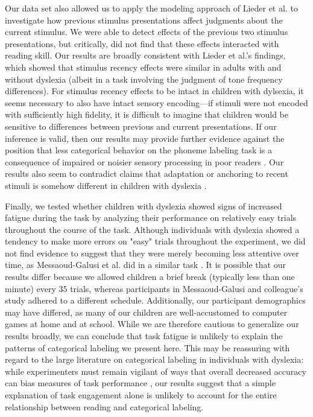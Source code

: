 \documentclass[../uwthesis.tex]{subfiles}
\begin{document}
Our data set also allowed us to apply the modeling approach of Lieder et al. \citep{Lieder2019PerceptualDyslexia} to investigate how previous stimulus presentations affect judgments about the current stimulus. We were able to detect effects of the previous two stimulus presentations, but critically, did not find that these effects interacted with reading skill. Our results are broadly consistent with Lieder et al.'s findings, which showed that stimulus recency effects were similar in adults with and without dyslexia (albeit in a task involving the judgment of tone frequency differences). For stimulus recency effects to be intact in children with dylsexia, it seems necessary to also have intact sensory encoding---if stimuli were not encoded with sufficiently high fidelity, it is difficult to imagine that children would be sensitive to differences between previous and current presentations. If our inference is valid, then our results may provide further evidence against the position that less categorical behavior on the phoneme labeling task is a consequence of impaired or noisier sensory processing in poor readers \citep{Goswami2011,Hancock2017NeuralDyslexia,Casini2018ItsDyslexia}. Our results also seem to contradict claims that adaptation or anchoring to recent stimuli is somehow different in children with dyslexia \citep{Jaffe-Dax2017DyslexicsAdaptation,Ahissar2006,Perrachione2016DysfunctionDyslexia,Krause2015PayDyslexia,Nicolson2018ProceduralCommitment}.

Finally, we tested whether children with dyslexia showed signs of increased fatigue during the task by analyzing their performance on relatively easy trials throughout the course of the task. Although individuals with dyslexia showed a tendency to make more errors on "easy" trials throughout the experiment, we did not find evidence to suggest that they were merely becoming less attentive over time, as Messaoud-Galusi et al. did in a similar task \citep{Messaoud-Galusi2011}. It is possible that our results differ because we allowed children a brief break (typically less than one minute) every 35 trials, whereas participants in Messaoud-Galusi and colleague's study adhered to a different schedule. Additionally, our participant demographics may have differed, as many of our children are well-accustomed to computer games at home and at school. While we are therefore cautious to generalize our results broadly, we can conclude that task fatigue is unlikely to explain the patterns of categorical labeling we present here. This may be reassuring with regard to the large literature on categorical labeling in individuals with dyslexia: while experimenters must remain vigilant of ways that overall decreased accuracy can bias measures of task performance \citep{Wichmann2001,Roach2004}, our results suggest that a simple explanation of task engagement alone is unlikely to account for the entire relationship between reading and categorical labeling. 
\end{document}

